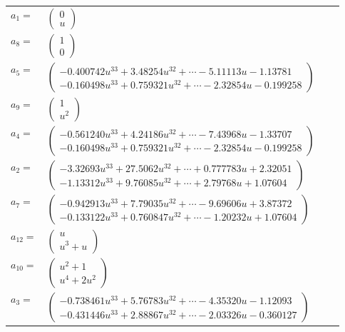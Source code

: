 \documentclass[1p]{elsarticle_modified}
\theoremstyle{definition}
\begin{document}
\begin{tabular}{m{7pt} m{180pt} m{7pt} m{180pt} }
\flushright $a_{1}=$&$\begin{pmatrix}0\\u\end{pmatrix}$ \\
\flushright $a_{8}=$&$\begin{pmatrix}1\\0\end{pmatrix}$ \\
\flushright $a_{5}=$&$\begin{pmatrix}-0.400742 u^{33}+3.48254 u^{32}+\cdots-5.11113 u-1.13781\\-0.160498 u^{33}+0.759321 u^{32}+\cdots-2.32854 u-0.199258\end{pmatrix}$ \\
\flushright $a_{9}=$&$\begin{pmatrix}1\\u^2\end{pmatrix}$ \\
\flushright $a_{4}=$&$\begin{pmatrix}-0.561240 u^{33}+4.24186 u^{32}+\cdots-7.43968 u-1.33707\\-0.160498 u^{33}+0.759321 u^{32}+\cdots-2.32854 u-0.199258\end{pmatrix}$ \\
\flushright $a_{2}=$&$\begin{pmatrix}-3.32693 u^{33}+27.5062 u^{32}+\cdots+0.777783 u+2.32051\\-1.13312 u^{33}+9.76085 u^{32}+\cdots+2.79768 u+1.07604\end{pmatrix}$ \\
\flushright $a_{7}=$&$\begin{pmatrix}-0.942913 u^{33}+7.79035 u^{32}+\cdots-9.69606 u+3.87372\\-0.133122 u^{33}+0.760847 u^{32}+\cdots-1.20232 u+1.07604\end{pmatrix}$ \\
\flushright $a_{12}=$&$\begin{pmatrix}u\\u^3+u\end{pmatrix}$ \\
\flushright $a_{10}=$&$\begin{pmatrix}u^2+1\\u^4+2 u^2\end{pmatrix}$ \\
\flushright $a_{3}=$&$\begin{pmatrix}-0.738461 u^{33}+5.76783 u^{32}+\cdots-4.35320 u-1.12093\\-0.431446 u^{33}+2.88867 u^{32}+\cdots-2.03326 u-0.360127\end{pmatrix}$ \\

\end{tabular}
\end{document}
